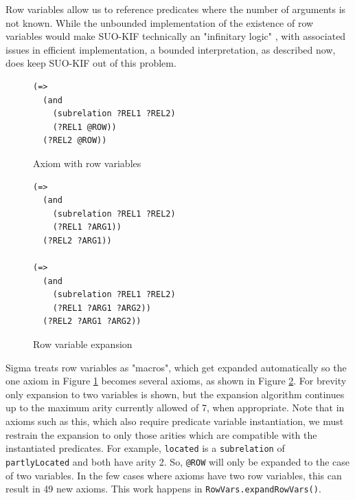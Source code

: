 \documentclass{book}
\begin{document}
\begin{sloppypar}
Row variables allow us to reference predicates where the
number of arguments is not known. While the unbounded implementation of the
existence of row variables would make SUO-KIF technically an "infinitary logic"
\cite{hayes2001}, with associated issues in efficient implementation, a bounded
interpretation, as described now, does keep SUO-KIF out of this problem.
\end{sloppypar}

\begin{figure}
\begin{framed}
\begin{verbatim}
(=>
  (and
    (subrelation ?REL1 ?REL2)
    (?REL1 @ROW))
  (?REL2 @ROW))
\end{verbatim}
\caption{Axiom with row variables}
\label{fig:RowVar}
\end{framed} 
\end{figure}

\begin{figure}
\begin{framed}
\begin{verbatim}
(=>
  (and
    (subrelation ?REL1 ?REL2)
    (?REL1 ?ARG1))
  (?REL2 ?ARG1))

(=>
  (and
    (subrelation ?REL1 ?REL2)
    (?REL1 ?ARG1 ?ARG2))
  (?REL2 ?ARG1 ?ARG2))
\end{verbatim}
\caption{Row variable expansion}
\label{fig:RowExpand}
\end{framed} 
\end{figure}

Sigma treats row variables as "macros", which get expanded
automatically so the one axiom in Figure \ref{fig:RowVar} becomes several
axioms, as shown in Figure \ref{fig:RowExpand}.  For brevity only expansion to
two variables is shown, but the expansion algorithm continues up to the maximum
arity currently allowed of 7, when appropriate.  Note that in axioms such as
this, which also require predicate variable instantiation, we must restrain the
expansion to only those arities which are compatible with the instantiated
predicates.  For example,  \texttt{located} is a
 \texttt{subrelation} of  {\tt
partlyLocated} and both have arity 2.  So, {\tt @ROW} will only be expanded to
the case of two variables. In the few cases where axioms have two row variables,
this can result in 49 new axioms.  This work happens in 
\texttt{RowVars.expandRowVars()}.
\end{document}
